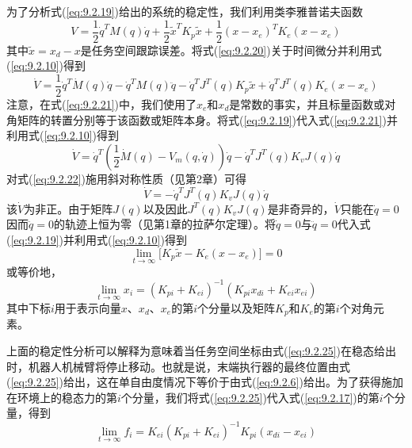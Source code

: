 \documentclass[12pt,a4paper]{ctexart}
\begin{document}
为了分析式(\ref{eq:9.2.19})给出的系统的稳定性，我们利用类李雅普诺夫函数
\begin{equation}\label{eq:9.2.20}
V = \frac{1}{2}\dot{q}^T M(q) \dot{q} + \frac{1}{2}\tilde{x}^T K_p \tilde{x} + \frac{1}{2}(x - x_e)^T K_e (x - x_e)
\end{equation}
其中$\tilde{x} = x_d - x$是任务空间跟踪误差。将式(\ref{eq:9.2.20})关于时间微分并利用式(\ref{eq:9.2.10})得到
\begin{equation}\label{eq:9.2.21}
\dot{V} = \frac{1}{2}\dot{q}^T \dot{M}(q) \dot{q} - \dot{q}^T M(q) \ddot{q} - \dot{q}^T J^T(q) K_p \tilde{x} + \dot{q}^T J^T(q) K_e(x - x_e)
\end{equation}
注意，在式(\ref{eq:9.2.21})中，我们使用了$x_e$和$x_d$是常数的事实，并且标量函数或对角矩阵的转置分别等于该函数或矩阵本身。将式(\ref{eq:9.2.19})代入式(\ref{eq:9.2.21})并利用式(\ref{eq:9.2.10})得到
\begin{equation}\label{eq:9.2.22}
\dot{V} = \dot{q}^T\left(\frac{1}{2}\dot{M}(q) - V_m(q, \dot{q})\right)\dot{q} - \dot{q}^T J^T(q) K_v J(q) \dot{q}
\end{equation}
对式(\ref{eq:9.2.22})施用斜对称性质（见第2章）可得
\begin{equation}\label{eq:9.2.23}
\dot{V} = -\dot{q}^T J^T(q) K_v J(q) \dot{q}
\end{equation}
该$\dot{V}$为非正。由于矩阵$J(q)$以及因此$J^T(q) K_v J(q)$是非奇异的，$\dot{V}$只能在$\dot{q} = 0$因而$\ddot{q} = 0$的轨迹上恒为零（见第1章的拉萨尔定理）。将$\dot{q} = 0$与$\ddot{q} = 0$代入式(\ref{eq:9.2.19})并利用式(\ref{eq:9.2.10})得到
\begin{equation}\label{eq:9.2.24}
\lim_{t \to \infty} \bigl[K_p \tilde{x} - K_e(x - x_e)\bigr] = 0
\end{equation}
或等价地，
\begin{equation}\label{eq:9.2.25}
\lim_{t \to \infty} x_i = (K_{pi} + K_{ei})^{-1} (K_{pi} x_{di} + K_{ei} x_{ei})
\end{equation}
其中下标$i$用于表示向量$x$、$x_d$、$x_e$的第$i$个分量以及矩阵$K_p$和$K_e$的第$i$个对角元素。

上面的稳定性分析可以解释为意味着当任务空间坐标由式(\ref{eq:9.2.25})在稳态给出时，机器人机械臂将停止移动。也就是说，末端执行器的最终位置由式(\ref{eq:9.2.25})给出，这在单自由度情况下等价于由式(\ref{eq:9.2.6})给出。为了获得施加在环境上的稳态力的第$i$个分量，我们将式(\ref{eq:9.2.25})代入式(\ref{eq:9.2.17})的第$i$个分量，得到
\begin{equation}\label{eq:9.2.26}
\lim_{t \to \infty} f_i = K_{ei} (K_{pi} + K_{ei})^{-1} K_{pi} (x_{di} - x_{ei})
\end{equation}
\end{document}
